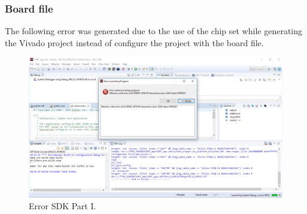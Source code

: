 \subsubsection{Board file}\label{subsubsec: Board fil}
The following error was generated due to the use of the chip set while generating the Vivado project instead of configure the project with the board file. 
\begin{figure}[H]
	\centering
	\includegraphics[width=1.0\textwidth]{01_images/Vivado_lab4_part1_SecondErrorSDK.PNG}
	\caption{Error SDK Part I.}
	\label{fig: Vivado_lab4_part1_SecondErrorSDK}
\end{figure}

